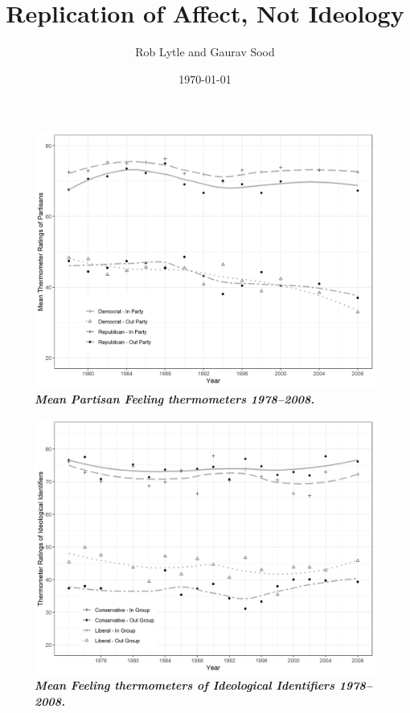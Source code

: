 \documentclass[12pt]{article}
\begin{document}
\title{Replication of Affect, Not Ideology}
\author{Rob Lytle and Gaurav Sood}
\date{\today}
\maketitle

\clearpage

\begin{figure}[H]
\center\includegraphics[width=5in]{fig_1.png}
\caption{\label{fig:1} \textit{\textbf{Mean Partisan Feeling thermometers 1978--2008.}}}
\end{figure}

\begin{figure}[H]
\center\includegraphics[width=5in]{fig_2.png}
\caption{\label{fig:2} \textit{\textbf{Mean Feeling thermometers of Ideological Identifiers 1978--2008.}}}
\end{figure}
\end{document}
